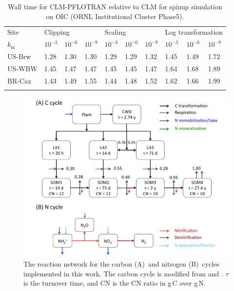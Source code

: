 \documentclass[gmdd, online, hvmath]{copernicus}
\begin{document}
\begin{table}[t]
\caption{Wall time for CLM-PFLOTRAN relative to CLM for spinup simulation on OIC (ORNL Institutional Cluster Phase5).}
\label{tab:computingtime}
\begin{tabular}{p{20mm}llp{15mm}llp{15mm}lll}
\tophline
Site &\multicolumn{3}{l}{Clipping}  &\multicolumn{3}{l}{Scaling} &\multicolumn{3}{l}{Log transformation} \\
\middlehline
$k_\mathrm{m}$ &$10^{-3}$ &$10^{-6}$ &$10^{-9}$ &$10^{-3}$ &$10^{-6}$ &$10^{-9}$ &$10^{-3}$ &$10^{-6}$ &$10^{-9}$\\
\cline{1-10}
US-Brw &1.28      &1.30 &1.30 &1.29 &1.29 &1.32 &1.45 &1.49 &1.72 \\
US-WBW   &1.45    &1.47 &1.47 &1.45 &1.45 &1.47 &1.64 &1.68 &1.89 \\
BR-Cax &1.43      &1.49 &1.55 &1.44 &1.48 &1.52 &1.62 &1.66 &1.99 \\
\bottomhline
\end{tabular}
\end{table}



\begin{figure}
\includegraphics[width=120mm]{gmd-2015-254-discussions-f01.pdf}
\caption{The reaction network for the carbon (A)~and nitrogen (B)~cycles implemented in this work. The carbon cycle is modified from \citet{Thornton2005} and \citet{Bonan2012}. $\tau$ is the turnover time, and CN is the CN ratio in g\,C over g\,N.}
\label{fig:conceptualmodel}
\end{figure}
\end{document}
